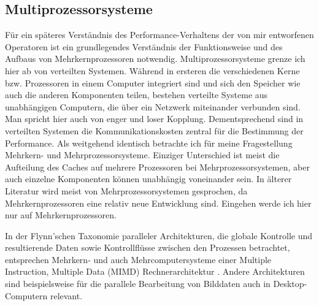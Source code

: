 \documentclass[a4paper,12pt,twoside]{article}
\begin{document}
\subsection{Multiprozessorsysteme}

Für ein späteres Verständnis des Performance-Verhaltens der von mir entworfenen Operatoren ist ein grundlegendes Verständnis der Funktionsweise und des Aufbaus von Mehrkernprozessoren notwendig. Multiprozessorsysteme grenze ich hier ab von verteilten Systemen. Während in ersteren die verschiedenen Kerne bzw. Prozessoren in einem Computer integriert sind und sich den Speicher wie auch die anderen Komponenten teilen, bestehen verteilte Systeme aus unabhängigen Computern, die über ein Netzwerk miteinander verbunden sind. Man spricht hier auch von enger und loser Kopplung. Dementsprechend sind in verteilten Systemen die Kommunikationskosten zentral für die Bestimmung der Performance. Als weitgehend identisch betrachte ich für meine Fragestellung Mehrkern- und Mehrprozessorsysteme. Einziger Unterschied ist meist die Aufteilung des Caches auf mehrere Prozessoren bei Mehrprozessorsystemen, aber auch einzelne Komponenten können unabhängig voneinander sein. In älterer Literatur wird meist von Mehrprozessorsystemen gesprochen, da Mehrkernprozessoren eine relativ neue Entwicklung sind. Eingehen werde ich hier nur auf Mehrkernprozessoren.

In der Flynn’schen Taxonomie paralleler Architekturen, die globale Kontrolle und resultierende Daten sowie Kontrollflüsse zwischen den Prozessen betrachtet, entsprechen Mehrkern- und auch Mehrcomputersysteme einer Multiple Instruction, Multiple Data (MIMD) Rechnerarchitektur \parencite[S. 10f]{Rauber2013}. Andere Architekturen sind beispielsweise für die parallele Bearbeitung von Bilddaten auch in Desktop-Computern relevant.
\end{document}
